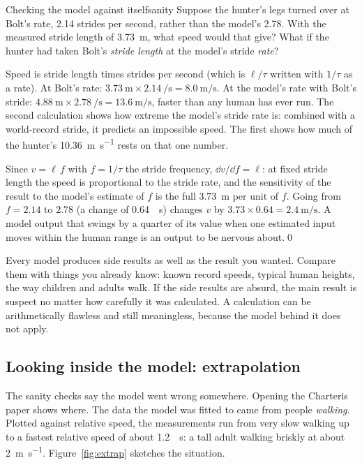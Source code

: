 \begin{example}{Checking the model against itself}{sanity}
Suppose the hunter's legs turned over at Bolt's rate, \num{2.14} strides per second, rather than the model's \num{2.78}. With the measured stride length of \SI{3.73}{\metre}, what speed would that give? What if the hunter had taken Bolt's \emph{stride length} at the model's stride \emph{rate}?

\elem Speed is stride length times strides per second (which is $\ell/\tau$ written with $1/\tau$ as a rate). At Bolt's rate: $\SI{3.73}{\metre} \times \SI{2.14}{\per\second} = \SI{8.0}{\metre\per\second}$. At the model's rate with Bolt's stride: $\SI{4.88}{\metre} \times \SI{2.78}{\per\second} = \SI{13.6}{\metre\per\second}$, faster than any human has ever run. The second calculation shows how extreme the model's stride rate is: combined with a world-record stride, it predicts an impossible speed. The first shows how much of the hunter's \SI{10.36}{\metre\per\second} rests on that one number.

\calc Since $v = \ell\,f$ with $f = 1/\tau$ the stride frequency, $\dd v/\dd f = \ell$: at fixed stride length the speed is proportional to the stride rate, and the sensitivity of the result to the model's estimate of $f$ is the full \SI{3.73}{\metre} per unit of $f$. Going from $f = 2.14$ to $2.78$ (a change of \SI{0.64}{\per\second}) changes $v$ by $3.73 \times 0.64 = \SI{2.4}{\metre\per\second}$. A model output that swings by a quarter of its value when one estimated input moves within the human range is an output to be nervous about.\qed
\end{example}

\begin{keyidea}
Every model produces side results as well as the result you wanted. Compare them with things you already know: known record speeds, typical human heights, the way children and adults walk. If the side results are absurd, the main result is suspect no matter how carefully it was calculated. A calculation can be arithmetically flawless and still meaningless, because the model behind it does not apply.
\end{keyidea}

\subsection{Looking inside the model: extrapolation}
\label{sec:extrap}

The sanity checks say the model went wrong somewhere. Opening the Charteris paper shows where. The data the model was fitted to came from people \emph{walking}. Plotted against relative speed, the measurements run from very slow walking up to a fastest relative speed of about \SI{1.2}{\per\second}: a tall adult walking briskly at about \SI{2}{\metre\per\second}. Figure~\ref{fig:extrap} sketches the situation.

